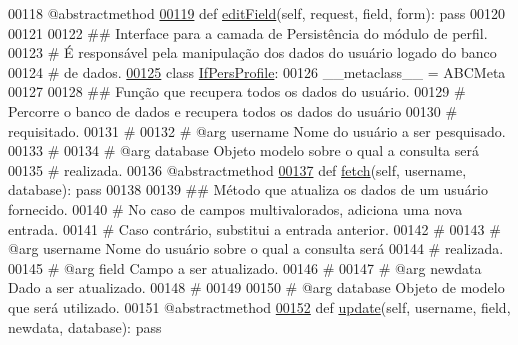 \begin{DoxyCode}
00118     @abstractmethod
\hypertarget{ProfileUnit_8py_source_l00119}{}\hyperlink{classProfile_1_1ProfileUnit_1_1IfBusProfile_a354782f4be9cd609f3c8754fad16f1ba}{00119}     \textcolor{keyword}{def }\hyperlink{classProfile_1_1ProfileUnit_1_1IfBusProfile_a354782f4be9cd609f3c8754fad16f1ba}{editField}(self, request, field, form): \textcolor{keyword}{pass}
00120 
00121 
00122 \textcolor{comment}{## Interface para a camada de Persistência do módulo de perfil.}
00123 \textcolor{comment}{#   É responsável pela manipulação dos dados do usuário logado do banco}
00124 \textcolor{comment}{#   de dados.}
\hypertarget{ProfileUnit_8py_source_l00125}{}\hyperlink{classProfile_1_1ProfileUnit_1_1IfPersProfile}{00125} \textcolor{keyword}{class }\hyperlink{classProfile_1_1ProfileUnit_1_1IfPersProfile}{IfPersProfile}:
00126     \_\_metaclass\_\_ = ABCMeta
00127 
00128     \textcolor{comment}{##  Função que recupera todos os dados do usuário.}
00129     \textcolor{comment}{#       Percorre o banco de dados e recupera todos os dados do usuário}
00130     \textcolor{comment}{#       requisitado.}
00131     \textcolor{comment}{#}
00132     \textcolor{comment}{#   @arg    username    Nome do usuário a ser pesquisado.}
00133     \textcolor{comment}{#}
00134     \textcolor{comment}{#   @arg    database    Objeto modelo sobre o qual a consulta será}
00135     \textcolor{comment}{#                       realizada.}
00136     @abstractmethod
\hypertarget{ProfileUnit_8py_source_l00137}{}\hyperlink{classProfile_1_1ProfileUnit_1_1IfPersProfile_aeb92a2bc236905b748015965a0da62f0}{00137}     \textcolor{keyword}{def }\hyperlink{classProfile_1_1ProfileUnit_1_1IfPersProfile_aeb92a2bc236905b748015965a0da62f0}{fetch}(self, username, database): \textcolor{keyword}{pass}
00138 
00139     \textcolor{comment}{##  Método que atualiza os dados de um usuário fornecido.}
00140     \textcolor{comment}{#       No caso de campos multivalorados, adiciona uma nova entrada.}
00141     \textcolor{comment}{#       Caso contrário, substitui a entrada anterior.}
00142     \textcolor{comment}{#}
00143     \textcolor{comment}{#   @arg    username    Nome do usuário sobre o qual a consulta será}
00144     \textcolor{comment}{#                       realizada.}
00145     \textcolor{comment}{#   @arg    field       Campo a ser atualizado.}
00146     \textcolor{comment}{#}
00147     \textcolor{comment}{#   @arg    newdata     Dado a ser atualizado.}
00148     \textcolor{comment}{#}
00149 
00150     \textcolor{comment}{#   @arg    database    Objeto de modelo que será utilizado.}
00151     @abstractmethod
\hypertarget{ProfileUnit_8py_source_l00152}{}\hyperlink{classProfile_1_1ProfileUnit_1_1IfPersProfile_a3a9da33f5497c97807cce70960d9db1a}{00152}     \textcolor{keyword}{def }\hyperlink{classProfile_1_1ProfileUnit_1_1IfPersProfile_a3a9da33f5497c97807cce70960d9db1a}{update}(self, username, field, newdata, database): \textcolor{keyword}{pass}

\end{DoxyCode}

